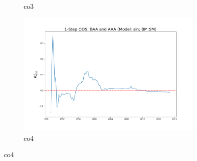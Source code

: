 \documentclass[a4paper,12pt,times,numbered,print,index]{report}
\numberwithin{equation}{section}
\begin{document}
\begin{figure}[!htbp]
\begin{subfigure}[b]{0.42\linewidth}
			\caption{co3}
		\end{subfigure}
		\begin{subfigure}[b]{0.42\linewidth}
			\includegraphics[width=0.9\linewidth]{OOS_plots/sin_co4_SM.png}
			\caption{co4}
		\end{subfigure}
		\label{g1}
	\end{figure}
	
\end{document}
